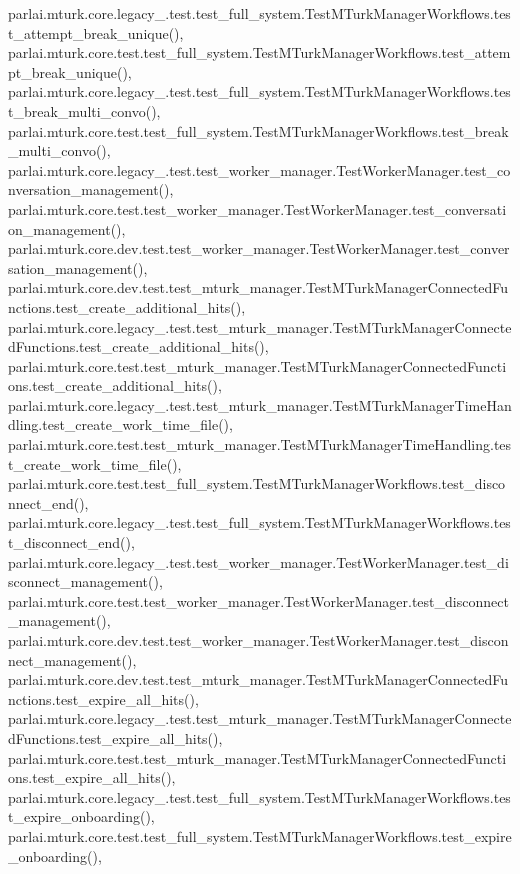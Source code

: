 parlai.\+mturk.\+core.\+legacy\+\_.\+test.\+test\+\_\+full\+\_\+system.\+Test\+M\+Turk\+Manager\+Workflows.\+test\+\_\+attempt\+\_\+break\+\_\+unique(), parlai.\+mturk.\+core.\+test.\+test\+\_\+full\+\_\+system.\+Test\+M\+Turk\+Manager\+Workflows.\+test\+\_\+attempt\+\_\+break\+\_\+unique(), parlai.\+mturk.\+core.\+legacy\+\_.\+test.\+test\+\_\+full\+\_\+system.\+Test\+M\+Turk\+Manager\+Workflows.\+test\+\_\+break\+\_\+multi\+\_\+convo(), parlai.\+mturk.\+core.\+test.\+test\+\_\+full\+\_\+system.\+Test\+M\+Turk\+Manager\+Workflows.\+test\+\_\+break\+\_\+multi\+\_\+convo(), parlai.\+mturk.\+core.\+legacy\+\_.\+test.\+test\+\_\+worker\+\_\+manager.\+Test\+Worker\+Manager.\+test\+\_\+conversation\+\_\+management(), parlai.\+mturk.\+core.\+test.\+test\+\_\+worker\+\_\+manager.\+Test\+Worker\+Manager.\+test\+\_\+conversation\+\_\+management(), parlai.\+mturk.\+core.\+dev.\+test.\+test\+\_\+worker\+\_\+manager.\+Test\+Worker\+Manager.\+test\+\_\+conversation\+\_\+management(), parlai.\+mturk.\+core.\+dev.\+test.\+test\+\_\+mturk\+\_\+manager.\+Test\+M\+Turk\+Manager\+Connected\+Functions.\+test\+\_\+create\+\_\+additional\+\_\+hits(), parlai.\+mturk.\+core.\+legacy\+\_.\+test.\+test\+\_\+mturk\+\_\+manager.\+Test\+M\+Turk\+Manager\+Connected\+Functions.\+test\+\_\+create\+\_\+additional\+\_\+hits(), parlai.\+mturk.\+core.\+test.\+test\+\_\+mturk\+\_\+manager.\+Test\+M\+Turk\+Manager\+Connected\+Functions.\+test\+\_\+create\+\_\+additional\+\_\+hits(), parlai.\+mturk.\+core.\+legacy\+\_.\+test.\+test\+\_\+mturk\+\_\+manager.\+Test\+M\+Turk\+Manager\+Time\+Handling.\+test\+\_\+create\+\_\+work\+\_\+time\+\_\+file(), parlai.\+mturk.\+core.\+test.\+test\+\_\+mturk\+\_\+manager.\+Test\+M\+Turk\+Manager\+Time\+Handling.\+test\+\_\+create\+\_\+work\+\_\+time\+\_\+file(), parlai.\+mturk.\+core.\+test.\+test\+\_\+full\+\_\+system.\+Test\+M\+Turk\+Manager\+Workflows.\+test\+\_\+disconnect\+\_\+end(), parlai.\+mturk.\+core.\+legacy\+\_.\+test.\+test\+\_\+full\+\_\+system.\+Test\+M\+Turk\+Manager\+Workflows.\+test\+\_\+disconnect\+\_\+end(), parlai.\+mturk.\+core.\+legacy\+\_.\+test.\+test\+\_\+worker\+\_\+manager.\+Test\+Worker\+Manager.\+test\+\_\+disconnect\+\_\+management(), parlai.\+mturk.\+core.\+test.\+test\+\_\+worker\+\_\+manager.\+Test\+Worker\+Manager.\+test\+\_\+disconnect\+\_\+management(), parlai.\+mturk.\+core.\+dev.\+test.\+test\+\_\+worker\+\_\+manager.\+Test\+Worker\+Manager.\+test\+\_\+disconnect\+\_\+management(), parlai.\+mturk.\+core.\+dev.\+test.\+test\+\_\+mturk\+\_\+manager.\+Test\+M\+Turk\+Manager\+Connected\+Functions.\+test\+\_\+expire\+\_\+all\+\_\+hits(), parlai.\+mturk.\+core.\+legacy\+\_.\+test.\+test\+\_\+mturk\+\_\+manager.\+Test\+M\+Turk\+Manager\+Connected\+Functions.\+test\+\_\+expire\+\_\+all\+\_\+hits(), parlai.\+mturk.\+core.\+test.\+test\+\_\+mturk\+\_\+manager.\+Test\+M\+Turk\+Manager\+Connected\+Functions.\+test\+\_\+expire\+\_\+all\+\_\+hits(), parlai.\+mturk.\+core.\+legacy\+\_.\+test.\+test\+\_\+full\+\_\+system.\+Test\+M\+Turk\+Manager\+Workflows.\+test\+\_\+expire\+\_\+onboarding(), parlai.\+mturk.\+core.\+test.\+test\+\_\+full\+\_\+system.\+Test\+M\+Turk\+Manager\+Workflows.\+test\+\_\+expire\+\_\+onboarding(), 